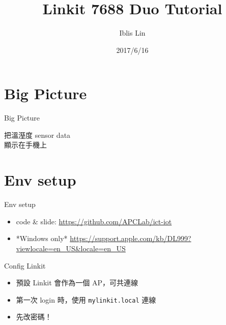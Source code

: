 \documentclass{beamer}
\begin{document}
\title[Linkit 7688 Duo Tutorial]{Linkit 7688 Duo Tutorial}

\author{Iblis Lin}

\date{2017/6/16}

\begin{frame}
  \titlepage
\end{frame}


\section{Big Picture}

\begin{frame}{Big Picture}
  \begin{center}
    \Huge
    把溫溼度 sensor data \\
    顯示在手機上
  \end{center}
\end{frame}


\section{Env setup}

\begin{frame}{Env setup}
  \begin{itemize}
    \item code \& slide: \url{https://github.com/APCLab/ict-iot}

    \item *Windows only* \url{https://support.apple.com/kb/DL999?viewlocale=en_US&locale=en_US}
  \end{itemize}
\end{frame}

\begin{frame}[fragile]{Config Linkit}
  \Large
  \begin{itemize}
    \item 預設 Linkit 會作為一個 AP，可共連線

    \item 第一次 login 時，使用 \verb|mylinkit.local| 連線

    \item 先改密碼！
  \end{itemize}
\end{frame}
\end{document}
